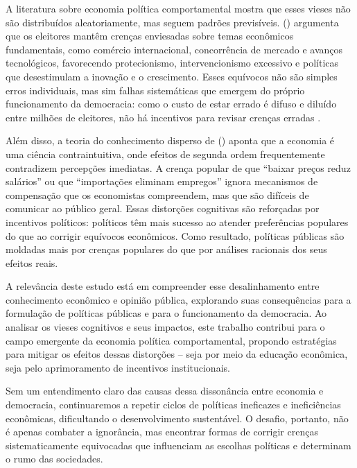 A literatura sobre economia política comportamental mostra que esses vieses não são distribuídos aleatoriamente, mas seguem padrões previsíveis.  (\citeyear{The_Myth_of_the_Rational_Voter}) argumenta que os eleitores mantêm crenças enviesadas sobre temas econômicos fundamentais, como comércio internacional, concorrência de mercado e avanços tecnológicos, favorecendo protecionismo, intervencionismo excessivo e políticas que desestimulam a inovação e o crescimento. Esses equívocos não são simples erros individuais, mas sim falhas sistemáticas que emergem do próprio funcionamento da democracia: como o custo de estar errado é difuso e diluído entre milhões de eleitores, não há incentivos para revisar crenças erradas \cite{downs1957economic}.

Além disso, a teoria do conhecimento disperso de  (\citeyear{hayek_knowledge_use}) aponta que a economia é uma ciência contraintuitiva, onde efeitos de segunda ordem frequentemente contradizem percepções imediatas. A crença popular de que “baixar preços reduz salários” ou que “importações eliminam empregos” ignora mecanismos de compensação que os economistas compreendem, mas que são difíceis de comunicar ao público geral. Essas distorções cognitivas são reforçadas por incentivos políticos: políticos têm mais sucesso ao atender preferências populares do que ao corrigir equívocos econômicos. Como resultado, políticas públicas são moldadas mais por crenças populares do que por análises racionais dos seus efeitos reais.

A relevância deste estudo está em compreender esse desalinhamento entre conhecimento econômico e opinião pública, explorando suas consequências para a formulação de políticas públicas e para o funcionamento da democracia. Ao analisar os vieses cognitivos e seus impactos, este trabalho contribui para o campo emergente da economia política comportamental, propondo estratégias para mitigar os efeitos dessas distorções – seja por meio da educação econômica, seja pelo aprimoramento de incentivos institucionais.

Sem um entendimento claro das causas dessa dissonância entre economia e democracia, continuaremos a repetir ciclos de políticas ineficazes e ineficiências econômicas, dificultando o desenvolvimento sustentável. O desafio, portanto, não é apenas combater a ignorância, mas encontrar formas de corrigir crenças sistematicamente equivocadas que influenciam as escolhas políticas e determinam o rumo das sociedades.

